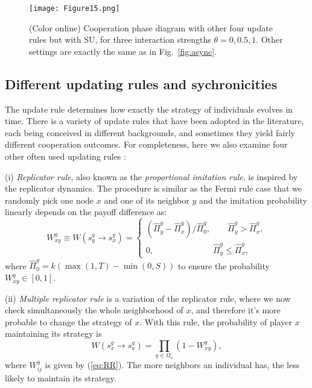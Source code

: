 \documentclass[showpacs,superscriptaddress,reprint,nofootinbib,amsmath,amssymb,aps,pre]{revtex4-1}
\begin{document}
\begin{figure*}
\centering
\texttt{[image: Figure15.png]}
\caption{(Color online)
Cooperation phase diagram with other four update rules but with SU, for three interaction strengths $\theta=0,0.5,1$. 
Other settings are exactly the same as in Fig.~\ref{fig:async}.
}
\label{fig:sync}
\end{figure*}

\subsection{Different updating rules and sychronicities}\label{subsec:rules}
The update rule determines how exactly the strategy of individuals evolves in time. There is a variety of update rules that have been adopted in the literature, each being conceived in different backgrounds, and sometimes they yield fairly different cooperation outcomes. For completeness, here we also examine four other often used updating rules \cite{roca2009evolutionary}:

(i) \emph{Replicator rule}, also known as the \emph{proportional imitation rule}, is inspired by the replicator dynamics. The procedure is similar as the Fermi rule case that we randomly pick one node $x$ and one of its neighbor $y$ and the imitation probability linearly depends on the payoff difference as:
 \begin{equation}
     W^g_{xy}\equiv W(s^g_y \rightarrow s^g_x)=\left\{
                \begin{array}{ll}
                  (\widehat{\Pi}_y^g - \widehat{\Pi}_x^g)/\widehat{\Pi}_0^g, \qquad \widehat{\Pi}_y^g>\widehat{\Pi}_x^g,\\
                  0, \qquad\qquad\quad\qquad  \widehat{\Pi}_y^g\leq\widehat{\Pi}_x^g,
                \end{array}
              \right. \label{eq:RR}
\end{equation}
where $\widehat{\Pi}_0^g=k(\max(1,T) - \min(0,S))$ to ensure the probability $W^g_{xy}\in[0,1]$.

(ii) \emph{Multiple replicator rule} is a variation of the replicator rule, where we now check simultaneously the whole neighborhood of $x$, and therefore it's more probable to change the strategy of $x$. With this rule, the probability of player $x$ maintaining its strategy is 
 \begin{equation}
W(s^g_x \rightarrow s^g_x)=\prod_{y\in\Omega_x} (1-W^g_{xy}),\label{eq:MRR}
\end{equation}
where $W^g_{ij}$ is given by (\ref{eq:RR}). The more neighbors an individual has, the less likely to maintain its strategy.
\end{document}

